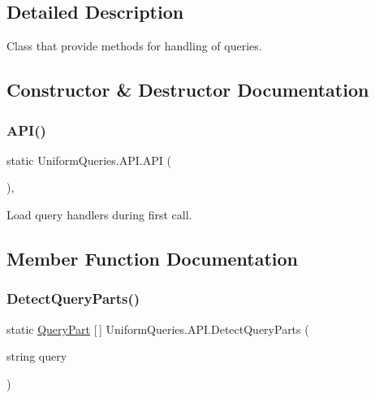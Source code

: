 \subsection{Detailed Description}
Class that provide methods for handling of queries. 



\subsection{Constructor \& Destructor Documentation}
\mbox{\label{class_uniform_queries_1_1_a_p_i_a8dbe3d00dcf507ab3cea1dc58e1e154f}} 
\subsubsection{\texorpdfstring{A\+P\+I()}{API()}}
{\footnotesize\ttfamily static Uniform\+Queries.\+A\+P\+I.\+A\+PI (\begin{DoxyParamCaption}{ }\end{DoxyParamCaption})\hspace{0.3cm}{\ttfamily [static]}, {\ttfamily [private]}}



Load query handlers during first call. 



\subsection{Member Function Documentation}
\mbox{\label{class_uniform_queries_1_1_a_p_i_a013ca0eff0e67d7f30a6be289312b859}} 
\subsubsection{\texorpdfstring{Detect\+Query\+Parts()}{DetectQueryParts()}\hspace{0.1cm}{\footnotesize\ttfamily [1/2]}}
{\footnotesize\ttfamily static \mbox{\hyperlink{struct_uniform_queries_1_1_query_part}{Query\+Part}} \mbox{[}$\,$\mbox{]} Uniform\+Queries.\+A\+P\+I.\+Detect\+Query\+Parts (\begin{DoxyParamCaption}\item[{string}]{query }\end{DoxyParamCaption})\hspace{0.3cm}{\ttfamily [static]}}




